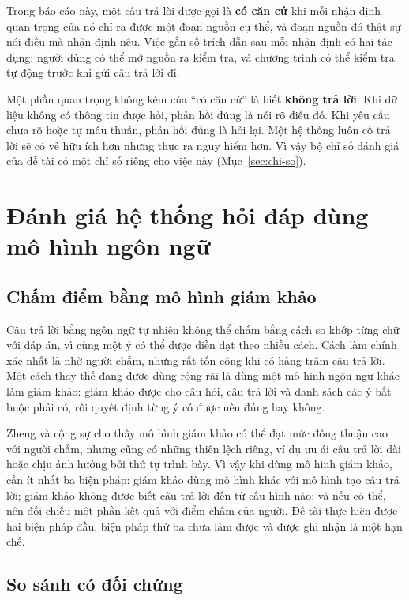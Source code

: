 Trong báo cáo này, một câu trả lời được gọi là \textbf{có căn cứ} khi mỗi nhận định quan trọng của nó chỉ ra được một đoạn nguồn cụ thể, và đoạn nguồn đó thật sự nói điều mà nhận định nêu. Việc gắn số trích dẫn sau mỗi nhận định có hai tác dụng: người dùng có thể mở nguồn ra kiểm tra, và chương trình có thể kiểm tra tự động trước khi gửi câu trả lời đi.

Một phần quan trọng không kém của ``có căn cứ'' là biết \textbf{không trả lời}. Khi dữ liệu không có thông tin được hỏi, phản hồi đúng là nói rõ điều đó. Khi yêu cầu chưa rõ hoặc tự mâu thuẫn, phản hồi đúng là hỏi lại. Một hệ thống luôn cố trả lời sẽ có vẻ hữu ích hơn nhưng thực ra nguy hiểm hơn. Vì vậy bộ chỉ số đánh giá của đề tài có một chỉ số riêng cho việc này (Mục~\ref{sec:chi-so}).

\section{Đánh giá hệ thống hỏi đáp dùng mô hình ngôn ngữ}

\subsection{Chấm điểm bằng mô hình giám khảo}

Câu trả lời bằng ngôn ngữ tự nhiên không thể chấm bằng cách so khớp từng chữ với đáp án, vì cùng một ý có thể được diễn đạt theo nhiều cách. Cách làm chính xác nhất là nhờ người chấm, nhưng rất tốn công khi có hàng trăm câu trả lời. Một cách thay thế đang được dùng rộng rãi là dùng một mô hình ngôn ngữ khác làm giám khảo: giám khảo được cho câu hỏi, câu trả lời và danh sách các ý bắt buộc phải có, rồi quyết định từng ý có được nêu đúng hay không.

Zheng và cộng sự  cho thấy mô hình giám khảo có thể đạt mức đồng thuận cao với người chấm, nhưng cũng có những thiên lệch riêng, ví dụ ưu ái câu trả lời dài hoặc chịu ảnh hưởng bởi thứ tự trình bày. Vì vậy khi dùng mô hình giám khảo, cần ít nhất ba biện pháp: giám khảo dùng mô hình khác với mô hình tạo câu trả lời; giám khảo không được biết câu trả lời đến từ cấu hình nào; và nếu có thể, nên đối chiếu một phần kết quả với điểm chấm của người. Đề tài thực hiện được hai biện pháp đầu, biện pháp thứ ba chưa làm được và được ghi nhận là một hạn chế.

\subsection{So sánh có đối chứng}


